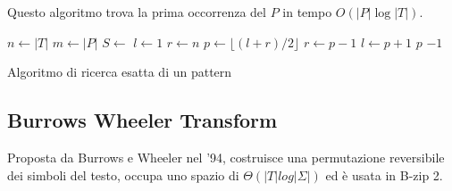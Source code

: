 Questo algoritmo trova la prima occorrenza del $P$ in tempo $O(|P| \log |T|)$.
\begin{algorithm}[!ht]
    \begin{algorithmic}
        \State $n \gets |T|$
        \State $m \gets |P|$
        \State $S \gets$ 
        \State $l \gets 1$
        \State $r \gets n$
        \State $p \gets \lfloor (l + r) / 2 \rfloor$
        \State $r \gets p - 1$
        \State $l \gets p + 1$
        \Else
        \State \Return $p$
        \EndIf
        \EndWhile
        \State \Return $-1$
        \EndFunction
    \end{algorithmic}
    \caption{Algoritmo di ricerca esatta di un pattern}
\end{algorithm}
\subsection{Burrows Wheeler Transform}
Proposta da Burrows e Wheeler nel '94, costruisce una permutazione reversibile
dei simboli del testo, occupa uno spazio di $\Theta(|T|log |\Sigma|)$ ed è usata
in B-zip 2.

